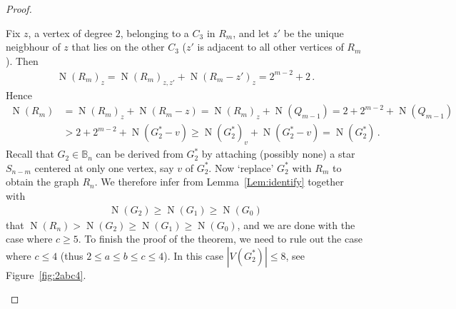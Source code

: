 \documentclass[a4paper,12pt]{amsart}
\theoremstyle{remark}
\DeclareMathOperator{\N}{N}
\begin{document}
\begin{proof}
\begin{itemize}
Fix $z$, a vertex of degree $2$, belonging to a $C_3$ in $R_m$, and let $z'$ be the unique neigbhour of $z$ that lies on the other $C_3$ ($z'$ is adjacent to all other vertices of $R_m$). Then
\begin{align*}
\N(R_m)_z=\N(R_m)_{z,z'}+ \N(R_m-z')_z=2^{m-2}+2\,.
\end{align*} 
Hence
\begin{align*}
\N(R_m)&=\N(R_m)_z + \N(R_m-z) =\N(R_m)_z + \N(Q_{m-1}) =  2+2^{m-2} + \N(Q_{m-1}) \\
& >2+ 2^{m-2} + \N(G_2^* -v) \geq \N(G_2^*)_v + \N(G_2^* -v) = \N(G_2^*)\,.
\end{align*}
Recall that $G_2 \in \mathbb{B}_n$ can be derived from $G_2^*$ by attaching (possibly none) a star $S_{n-m}$ centered at only one vertex, say $v$ of $G_2^*$. Now `replace' $G_2^*$ with $R_m$ to obtain the graph $R_n$. We therefore infer from Lemma~\ref{Lem:identify} together with
\begin{align*}
\N(G_2) \geq \N(G_1) \geq \N(G_0)
\end{align*}
that $\N(R_n) > \N(G_2) \geq \N(G_1) \geq \N(G_0)$, and we are done with the case where $c\geq 5$. To finish the proof of the theorem, we need to rule out the case where $c\leq 4$ (thus $2\leq a \leq b \leq c \leq 4$). In this case $|V(G_2^*)| \leq 8$, see Figure~\ref{fig:2abc4}.
\begin{figure}[h]
	\begin{center}
\end{center}
\end{figure}
\end{itemize}
\end{proof}
\end{document}
